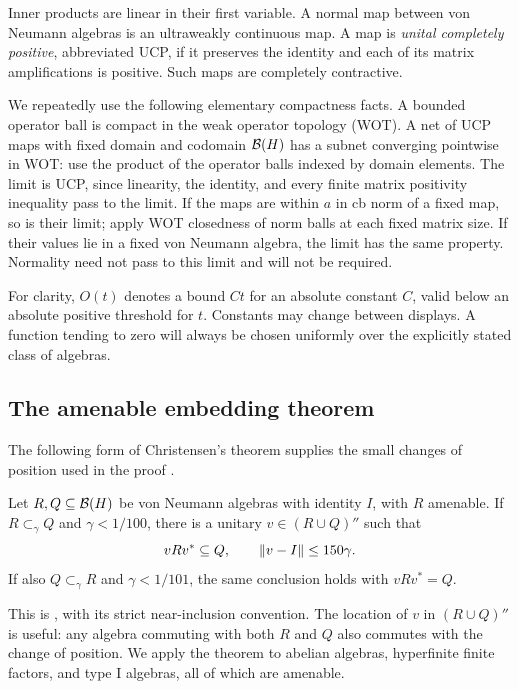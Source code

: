 Inner products are linear in their first variable. A normal map between
von Neumann algebras is an ultraweakly continuous map. A map is
\emph{unital completely positive}, abbreviated UCP, if it preserves the
identity and each of its matrix amplifications is positive. Such maps
are completely contractive.

We repeatedly use the following elementary compactness facts. A bounded
operator ball is compact in the weak operator topology (WOT). A net of
UCP maps with fixed domain and codomain $\mathcal B(H)$ has a subnet converging pointwise in WOT:
use the product of the operator balls indexed by domain elements.
The limit is UCP, since linearity, the identity, and every finite matrix
positivity inequality pass to the limit. If the maps are within $a$ in
cb norm of a fixed map, so is their limit; apply WOT closedness of norm
balls at each fixed matrix size. If their values lie in a fixed von
Neumann algebra, the limit has the same property. Normality need not
pass to this limit and will not be required.

For clarity, $O(t)$ denotes a bound $Ct$ for an absolute constant $C$,
valid below an absolute positive threshold for $t$. Constants may change
between displays. A function tending to zero will always be chosen
uniformly over the explicitly stated class of algebras.

\subsection{The amenable embedding theorem}

The following form of Christensen's theorem supplies the small changes
of position used in the proof \cite{Christensen1980}.

\begin{theorem}\label{thm:amenable}
Let $R,Q\subseteq\mathcal B(H)$ be von Neumann algebras with identity $I$, with
$R$ amenable. If $R\subset_\gamma Q$ and $\gamma<1/100$, there is a
unitary $v\in(R\cup Q)''$ such that
\[
 vRv^*\subseteq Q,\qquad \lVert v-I\rVert\le150\gamma.
\]
If also $Q\subset_\gamma R$ and $\gamma<1/101$, the same conclusion
holds with $vRv^*=Q$.
\end{theorem}

This is \cite[Theorem~3.3(i)]{CCSSWW2014}, with its strict
near-inclusion convention. The location of $v$ in $(R\cup Q)''$ is
useful: any algebra commuting with both $R$ and $Q$ also commutes with
the change of position. We apply the theorem to abelian algebras,
hyperfinite finite factors, and type $\mathrm I$ algebras, all of which
are amenable.

